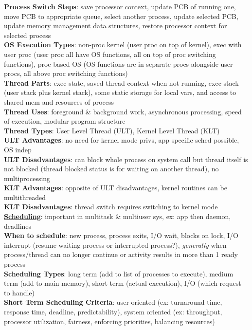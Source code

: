 \documentclass[a4paper]{article}
\begin{document}
\begin{multicols}{2}
        \textbf{Process Switch Steps}: save processor context, update PCB of running one, move PCB to appropriate queue, select another process, update selected PCB, update memory management data structures, restore processor context for selected process\\
        \textbf{OS Execution Types}: non-proc kernel (user proc on top of kernel), exec with user proc (user proc all have OS functions, all on top of proc switching functions), proc based OS (OS functions are in separate procs alongside user procs, all above proc switching functions)\\
        \textbf{Thread Parts}: exec state, saved thread context when not running, exec stack (user stack plus kernel stack), some static storage for local vars, and access to shared mem and resources of process\\
        \textbf{Thread Uses}: foreground \& background work, asynchronous processing, speed of execution, modular program structure\\
        \textbf{Thread Types}: User Level Thread (ULT), Kernel Level Thread (KLT)\\
        \textbf{ULT Advantages}: no need for kernel mode privs, app specific sched possible, OS indep\\
        \textbf{ULT Disadvantages}: can block whole process on system call but thread itself is not blocked (thread blocked status is for waiting on another thread), no multiprocessing\\
        \textbf{KLT Advantages}: opposite of ULT disadvantages, kernel routines can be multithreaded\\
        \textbf{KLT Disadvantages}: thread switch requires switching to kernel mode\\
        \underline{\textbf{Scheduling}}: important in multitask \& multiuser sys, ex: app then daemon, deadlines\\
        \textbf{When to schedule}: new process, process exits, I/O wait, blocks on lock, I/O interrupt (resume waiting process or interrupted process?), \textit{generally} when process/thread can no longer continue or activity results in more than 1 ready process\\
        \textbf{Scheduling Types}: long term (add to list of processes to execute), medium term (add to main memory), short term (actual execution), I/O (which request to handle)\\
        \textbf{Short Term Scheduling Criteria}: user oriented (ex: turnaround time, response time, deadline, predictability), system oriented (ex: throughput, processor utilization, fairness, enforcing priorities, balancing resources)\\

\end{multicols}
\end{document}
